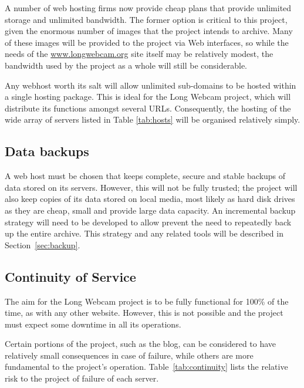\documentclass[11pt]{article}
\begin{document}
A number of web hosting firms now provide cheap plans that provide unlimited storage and unlimited bandwidth. The former option is critical to this project, given the enormous number of images that the project intends to archive. Many of these images will be provided to the project via Web interfaces, so while the needs of the \url{www.longwebcam.org} site itself may be relatively modest, the bandwidth used by the project as a whole will still be considerable.

Any webhost worth its salt will allow unlimited sub-domains to be hosted within a single hosting package. This is ideal for the Long Webcam project, which will distribute its functions amongst several URLs. Consequently, the hosting of the wide array of servers listed in Table \ref{tab:hosts} will be organised relatively simply.


\subsection{Data backups}
A web host must be chosen that keeps complete, secure and stable backups of data stored on its servers. However, this will not be fully trusted; the project will also keep copies of its data stored on local media, most likely as hard disk drives as they are cheap, small and provide large data capacity. An incremental backup strategy will need to be developed to allow prevent the need to repeatedly back up the entire archive. This strategy and any related tools will be described in Section~\ref{sec:backup}.

\subsection{Continuity of Service}
The aim for the Long Webcam project is to be fully functional for 100\% of the time, as with any other website. However, this is not possible and the project must expect some downtime in all its operations.

Certain portions of the project, such as the blog, can be considered to have relatively small consequences in case of failure, while others are more fundamental to the project's operation. Table~\ref{tab:continuity} lists the relative risk to the project of failure of each server.
\end{document}
